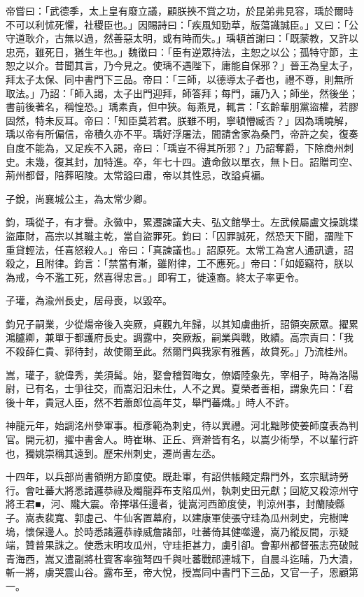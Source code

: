 \begin{pinyinscope}
 帝嘗曰：「武德季，太上皇有廢立議，顧朕挾不賞之功，於昆弟弗見容，瑀於爾時不可以利怵死懼，社稷臣也。」因賜詩曰：「疾風知勁草，版蕩識誠臣。」又曰：「公守道耿介，古無以過，然善惡太明，或有時而失。」瑀頓首謝曰：「既蒙教，又許以忠亮，雖死日，猶生年也。」魏徵曰：「臣有逆眾持法，主恕之以公；孤特守節，主恕之以介。昔聞其言，乃今見之。使瑀不遇陛下，庸能自保邪？」晉王為皇太子，拜太子太保、同中書門下三品。帝曰：「三師，以德導太子者也，禮不尊，則無所取法。」乃詔：「師入謁，太子出門迎拜，師答拜；每門，讓乃入；師坐，然後坐；書前後著名，稱惶恐。」瑀素貴，但中狹。每燕見，輒言：「玄齡輩朋黨盜權，若膠固然，特未反耳。帝曰：「知臣莫若君。朕雖不明，寧頓懵臧否？」因為瑀曉解，瑀以帝有所偏信，帝積久亦不平。瑀好浮屠法，間請舍家為桑門，帝許之矣，復奏自度不能為，又足疾不入謁，帝曰：「瑀豈不得其所邪？」乃詔奪爵，下除商州刺史。未幾，復其封，加特進。卒，年七十四。遺命斂以單衣，無卜日。詔贈司空、荊州都督，陪葬昭陵。太常謚曰肅，帝以其性忌，改謚貞褊。



 子銳，尚襄城公主，為太常少卿。



 鈞，瑀從子，有才譽。永徽中，累遷諫議大夫、弘文館學士。左武候屬盧文操跳堞盜庫財，高宗以其職主乾，當自盜罪死。鈞曰：「囚罪誠死，然恐天下聞，謂陛下重貸輕法，任喜怒殺人。」帝曰：「真諫議也。」詔原死。太常工為宮人通訊遺，詔殺之，且附律。鈞言：「禁當有漸，雖附律，工不應死。」帝曰：「如姬竊符，朕以為戒，今不濫工死，然喜得忠言。」即宥工，徙遠裔。終太子率更令。



 子瓘，為渝州長史，居母喪，以毀卒。



 鈞兄子嗣業，少從煬帝後入突厥，貞觀九年歸，以其知虜曲折，詔領突厥眾。擢累鴻臚卿，兼單于都護府長史。調露中，突厥叛，嗣業與戰，敗績。高宗責曰：「我不殺薛仁貴、郭待封，故使爾至此。然爾門與我家有雅舊，故貸死。」乃流桂州。



 嵩，瓘子，貌偉秀，美須髯。始，娶會稽賀晦女，僚婿陸象先，宰相子，時為洛陽尉，已有名，士爭往交，而嵩汩汩未仕，人不之異。夏榮者善相，謂象先曰：「君後十年，貴冠人臣，然不若蕭郎位高年艾，舉門蕃熾。」時人不許。



 神龍元年，始調洺州參軍事。桓彥範為刺史，待以異禮。河北黜陟使姜師度表為判官。開元初，擢中書舍人。時崔琳、正丘、齊澣皆有名，以嵩少術學，不以輩行許也，獨姚崇稱其遠到。歷宋州刺史，遷尚書左丞。



 十四年，以兵部尚書領朔方節度使。既赴軍，有詔供帳餞定鼎門外，玄宗賦詩勞行。會吐蕃大將悉諸邏恭祿及燭龍莽布支陷瓜州，執刺史田元獻；回紇又殺涼州守將王君■，河、隴大震。帝擇堪任邊者，徙嵩河西節度使，判涼州事，封蘭陵縣子。嵩表裴寬、郭虛己、牛仙客置幕府，以建康軍使張守珪為瓜州刺史，完樹陴塢，懷保邊人。於時悉諸邏恭祿威詹諸部，吐蕃倚其健噬邊，嵩乃縱反間，示疑端，贊普果誅之。使悉末明攻瓜州，守珪拒甚力，虜引卻。會鄯州都督張志亮破賊青海西，嵩又遣副將杜賓客率強弩四千與吐蕃戰祁連城下，自晨斗迄晡，乃大潰，斬一將，虜哭震山谷。露布至，帝大悅，授嵩同中書門下三品，又官一子，恩顧第一。




\end{pinyinscope}
